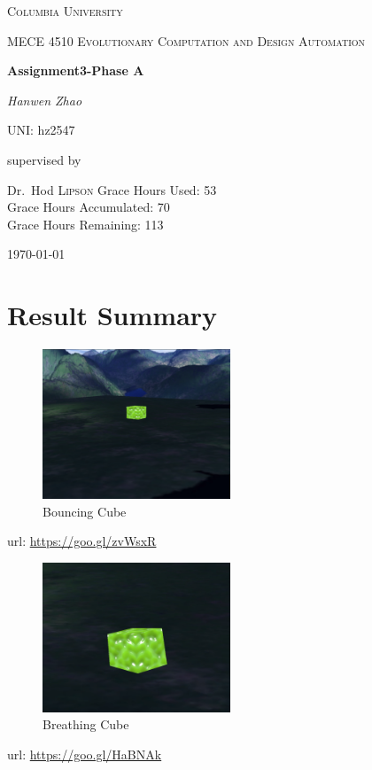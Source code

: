 \documentclass[12pt]{article}
\begin{document}
\begin{titlepage}
	\centering
	{\scshape\LARGE Columbia University \par}
	\vspace{1cm}
	{\scshape MECE 4510 Evolutionary Computation and Design Automation\par}
	\vspace{1.5cm}
	{\huge\bfseries Assignment3-Phase A\par}
	\vspace{2cm}
	{\Large\itshape Hanwen Zhao\par}
	{UNI: hz2547\par}
	\vfill
	supervised by\par
	Dr.~Hod \textsc{Lipson}
	\vfill
	Grace Hours Used: 53\\
	Grace Hours Accumulated: 70\\
	Grace Hours Remaining: 113 \\
	\vspace{2cm}
	{\large \today \ \currenttime \par}
\end{titlepage}

\newpage
\section{Result Summary}
\begin{figure}[H]
	\centering
	\includegraphics[width=0.5\textwidth]{BouncingCube}
	\caption[]%
	{{\small Bouncing Cube}}    
\end{figure}
url: \url{https://goo.gl/zvWsxR}

\begin{figure}[H]
	\centering
	\includegraphics[width=0.5\textwidth]{BreathingCube}
	\caption[]%
	{{\small Breathing Cube}}    
\end{figure}
\noindent
url: \url{https://goo.gl/HaBNAk}
\end{document}
